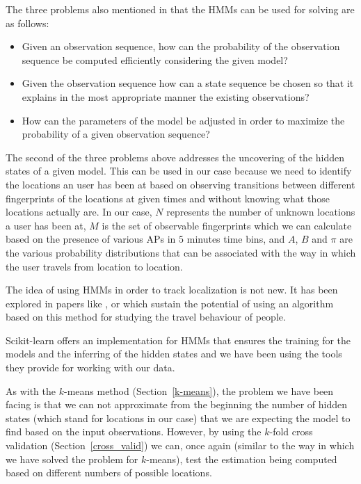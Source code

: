 The three problems also mentioned in \cite{18626} that the HMMs can be used for
solving are as follows:
\begin{itemize}
  \item Given an observation sequence, how can the probability of the
  observation sequence be computed efficiently considering the given model?
  \item Given the observation sequence how can a state sequence be chosen so
  that it explains in the most appropriate manner the existing observations?
  \item How can the parameters of the model be adjusted in order to maximize the
  probability of a given observation sequence?
\end{itemize}

The second of the three problems above addresses the uncovering of the hidden
states of a given model. This can be used in our case because we need to
identify the locations an user has been at based on observing transitions
between different fingerprints of the locations at given times and without
knowing what those locations actually are. In our case, $N$ represents the
number of unknown locations a user has been at, $M$ is the set of observable
fingerprints which we can calculate based on the presence of various APs in $5$
minutes time bins, and $A$, $B$ and $\pi$ are the various probability
distributions that can be associated with the way in which the user travels from
location to location.

The idea of using HMMs in order to track localization is not new. It has been
explored in papers like \cite{el2013indoor}, \cite{inatomi2013hidden} or
\cite{morelli2007hidden} which sustain the potential of using an algorithm based
on this method for studying the travel behaviour of people.

Scikit-learn \cite{Scikit} offers an implementation for HMMs that ensures the
training for the models and the inferring of the hidden states and we have been
using the tools they provide for working with our data.

As with the $k$-means method (Section~\ref{k-means}), the problem we have been
facing is that we can not approximate from the beginning the number of hidden
states (which stand for locations in our case) that we are expecting the model
to find based on the input observations. However, by using the $k$-fold cross
validation (Section~\ref{cross_valid}) we can, once again (similar to the way in
which we have solved the problem for $k$-means), test the estimation being
computed based on different numbers of possible locations.

